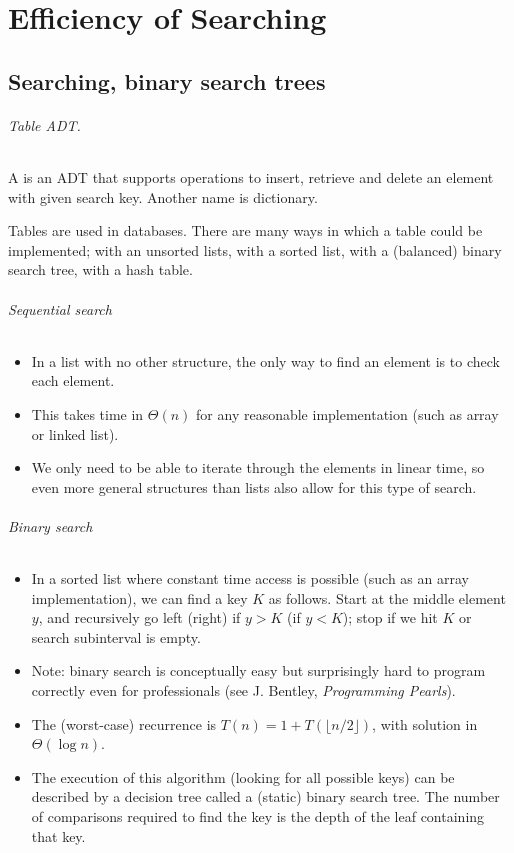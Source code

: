 \part{Efficiency of Searching}  
\label{ch:effsearch}

\chapter{Searching, binary search trees} %

\paragraph{Table ADT.}
\begin{Defintion}
A  is an ADT that supports operations to insert, retrieve and delete an element
with given search key.  Another name is \alert{dictionary}.
\end{Defintion}
Tables are used in databases. There are  many ways in which a table could be implemented;
with an unsorted lists, with a sorted list, with a (balanced) binary search tree, with a hash table.

\paragraph{Sequential search}
\begin{itemize}
\item In a list with no other structure, the only way to find an element is to 
check each element. 
\item This takes time in $\Theta(n)$ for any reasonable implementation (such as 
array or linked list).
\item We only need to be able to iterate through the elements in linear time, so
 even more general structures than lists also allow for this type of search.
\end{itemize}

\paragraph{Binary search}
\begin{itemize}
\item In a sorted list where constant time access is possible 
(such as an array implementation), we can find a key $K$ as follows. 
Start at the middle element $y$, and recursively go left (right) if $y>K$ (if $y<K$);
 stop if we hit  $K$ or search subinterval is empty.
\item Note: binary search is conceptually easy but surprisingly hard to program
 correctly even for professionals (see J. Bentley, \emph{Programming Pearls}).
\item The (worst-case) recurrence is $T(n) = 1 +  T(\lfloor n/2 \rfloor)$, with 
solution in $\Theta(\log n)$.
\item The execution of this algorithm (looking for all possible keys) can be 
described by a decision tree called a (static) \alert{binary search tree}. The 
number of comparisons required to find the key is the depth of the leaf 
containing that key.
\end{itemize}

